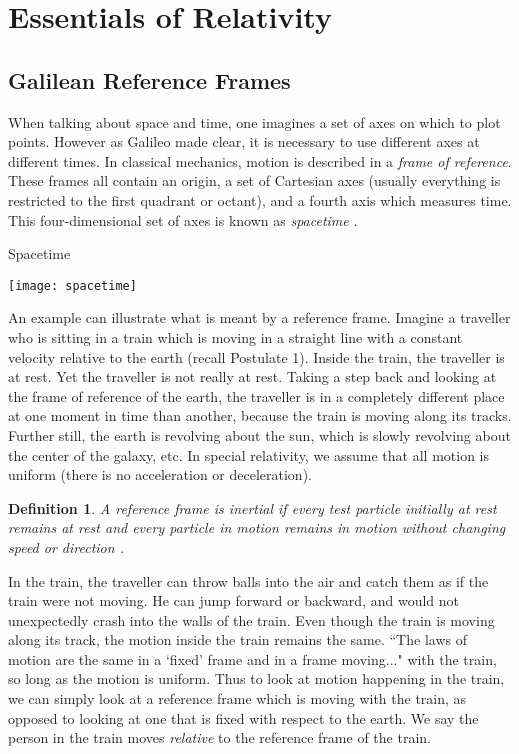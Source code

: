 \documentclass[12pt]{article}
\theoremstyle{defn}
\newtheorem{defn}{Definition}
\theoremstyle{pf}
\newcommand{\0}{\emptyset}
\renewcommand{\-}{\setminus}
\begin{document}
\section{Essentials of Relativity}  
\subsection{Galilean Reference Frames}

When talking about space and time, one imagines a set of axes on which to plot points. However as Galileo made clear, it is necessary to use different axes at different times. In classical mechanics, motion is described in a \textit{frame of reference}. These frames all contain an origin, a set of Cartesian axes (usually everything is restricted to the first quadrant or octant), and a fourth axis which measures time. This four-dimensional set of axes is known as \textit{spacetime} \cite{woodhouse}.
\newpage

{\small
\begin{center}Spacetime\end{center}}
\begin{center}\texttt{[image: spacetime]}\end{center}

An example can illustrate what is meant by a reference frame. Imagine a traveller who is sitting in a train which is moving in a straight line with a constant velocity relative to the earth (recall Postulate 1). Inside the train, the traveller is at rest. Yet the traveller is not really at rest. Taking a step back and looking at the frame of reference of the earth, the traveller is in a completely different place at one moment in time than another, because the train is moving along its tracks. Further still, the earth is revolving about the sun, which is slowly revolving about the center of the galaxy, etc. In special relativity, we assume that all motion is uniform (there is no acceleration or deceleration).

\begin{defn}A reference frame is \textit{inertial} if every test particle initially at rest remains at rest and every particle in motion remains in motion without changing speed or direction \cite{taylor_wheeler}.
\end{defn}

In the train, the traveller can throw balls into the air and catch them as if the train were not moving. He can jump forward or backward, and would not unexpectedly crash into the walls of the train. Even though the train is moving along its track, the motion inside the train remains the same. ``The laws of motion are the same in a `fixed' frame and in a frame moving..." \cite{woodhouse} with the train, so long as the motion is uniform. Thus to look at motion happening in the train, we can simply look at a reference frame which is moving with the train, as opposed to looking at one that is fixed with respect to the earth. We say the person in the train moves \textit{relative} to the reference frame of the train.
\end{document}
